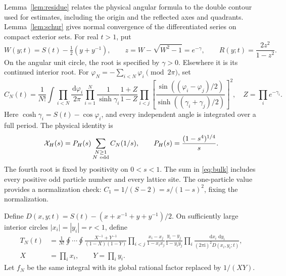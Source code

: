 \documentclass[11pt]{article}
\numberwithin{equation}{section}
\theoremstyle{definition}
\newcommand{\dd}{\,\mathrm d}
\newcommand{\ii}{\mathrm i}
\begin{document}
Lemma~\ref{lem:residue} relates the physical angular formula to the
double contour used for estimates, including the origin and the
reflected axes and quadrants. Lemma~\ref{lem:schur} gives normal
convergence of the differentiated series on compact exterior sets.
For real $t>1$, put
\[
 W(y;t)=S(t)-\tfrac12(y+y^{-1}),\qquad
 z=W-\sqrt{W^2-1}=e^{-\gamma},\qquad
 R(y;t)=\frac{2z^2}{1-z^2}.
\]
On the angular unit circle, the root is specified by $\gamma>0$.
Elsewhere it is its continued interior root. For
$\varphi_N=-\sum_{i<N}\varphi_i\pmod{2\pi}$, set
\begin{equation}
 C_N(t)=\frac1{N!}\int\prod_{i<N}\frac{\dd\varphi_i}{2\pi}
 \prod_{i=1}^N\frac1{\sinh\gamma_i}
 \frac{1+Z}{1-Z}
 \prod_{i<j}\left[
 \frac{\sin((\varphi_i-\varphi_j)/2)}
      {\sinh((\gamma_i+\gamma_j)/2)}\right]^2,
 \quad Z=\prod_i e^{-\gamma_i}.
 \label{eq:angular}
\end{equation}
Here $\cosh\gamma_i=S(t)-\cos\varphi_i$, and every independent
angle is integrated over a full period. The physical identity is
\begin{equation}
 \mathcal X_H(s)=P_H(s)\sum_{\substack{N\ge1\\N\ {\rm odd}}}C_N(1/s),
 \qquad P_H(s)=\frac{(1-s^4)^{1/4}}s.
 \label{eq:bulk}
\end{equation}
The fourth root is fixed by positivity on $0<s<1$. The sum in
\eqref{eq:bulk} includes every positive odd particle number and every
lattice site. The one-particle value provides a normalization check:
$C_1=1/(S-2)=s/(1-s)^2$, fixing the normalization.

Define $D(x,y;t)=S(t)-(x+x^{-1}+y+y^{-1})/2$. On sufficiently
large interior circles $|x_i|=|y_i|=r<1$, define
\begin{align}
 T_N(t)&=\frac1{N!}\oint\cdots\oint
 \frac{X^{-1}+Y^{-1}}{(1-X)(1-Y)}
 \prod_{i<j}\frac{x_i-x_j}{1-x_ix_j}\frac{y_i-y_j}{1-y_iy_j}
 \prod_i\frac{\dd x_i\,\dd y_i}{(2\pi\ii)^2D(x_i,y_i;t)},
 \label{eq:double}\\
 X&=\prod_i x_i,\qquad Y=\prod_i y_i.\nonumber
\end{align}
Let $f_N$ be the same integral with its global rational factor
replaced by $1/(XY)$.
\end{document}
